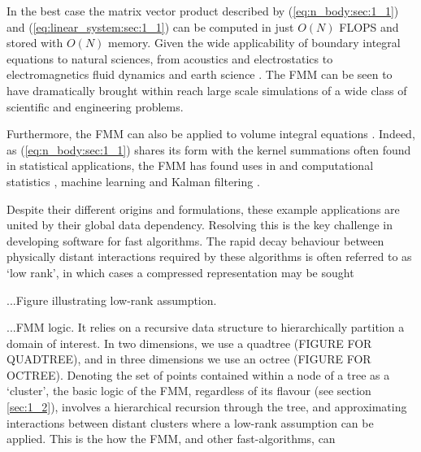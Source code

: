 In the best case the matrix vector product described by (\ref{eq:n_body:sec:1_1}) and (\ref{eq:linear_system:sec:1_1}) can be computed in just $O(N)$ \gls{FLOPS} and stored with $O(N)$ memory. Given the wide applicability of boundary integral equations to natural sciences, from acoustics \cite{wolf2011aeroacoustic,hao2015efficient} and electrostatics \cite{wang2021high} to electromagnetics \cite{darve2004fast} fluid dynamics \cite{rahimian2010petascale} and earth science \cite{chaillat2008multi}. The FMM can be seen to have dramatically brought within reach large scale simulations of a wide class of scientific and engineering problems. 

Furthermore, the FMM can also be applied to volume integral equations \cite{malhotra2015pvfmm}. Indeed, as (\ref{eq:n_body:sec:1_1}) shares its form with the kernel summations often found in statistical applications, the FMM has found uses in and computational statistics \cite{ambikasaran2013large}, machine learning \cite{lee2012distributed} and Kalman filtering \cite{li2014kalman}.

Despite their different origins and formulations, these example applications are united by their global data dependency. Resolving this is the key challenge in developing software for fast algorithms. The rapid decay behaviour between physically distant interactions required by these algorithms is often referred to as `low rank', in which cases a compressed representation may be sought

...Figure illustrating low-rank assumption.
 
...FMM logic. It relies on a recursive data structure to hierarchically partition a domain of interest. In two dimensions, we use a quadtree (FIGURE FOR QUADTREE), and in three dimensions we use an octree (FIGURE FOR OCTREE). Denoting the set of points contained within a node of a tree as a `cluster', the basic logic of the FMM, regardless of its flavour (see section \ref{sec:1_2}), involves a hierarchical recursion through the tree, and approximating interactions between distant clusters where a low-rank assumption can be applied. This is the how the FMM, and other fast-algorithms, can 




